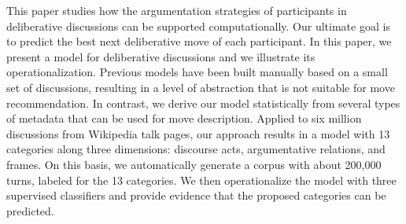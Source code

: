 This paper studies how the argumentation strategies of participants in deliberative discussions can be supported computationally. Our ultimate goal is to predict the best next deliberative move of each participant. In this paper, we present a model for deliberative discussions and we illustrate its operationalization. Previous models have been built manually based on a small set of discussions, resulting in a level of abstraction that is not suitable for move recommendation. In contrast, we derive our model statistically from several types of metadata that can be used for move description. Applied to six million discussions from Wikipedia talk pages, our approach results in a model with 13 categories along three dimensions: discourse acts, argumentative relations, and frames. On this basis, we automatically generate a corpus with about 200,000 turns, labeled for the 13 categories. We then operationalize the model with three supervised classifiers and provide evidence that the proposed categories can be predicted.
